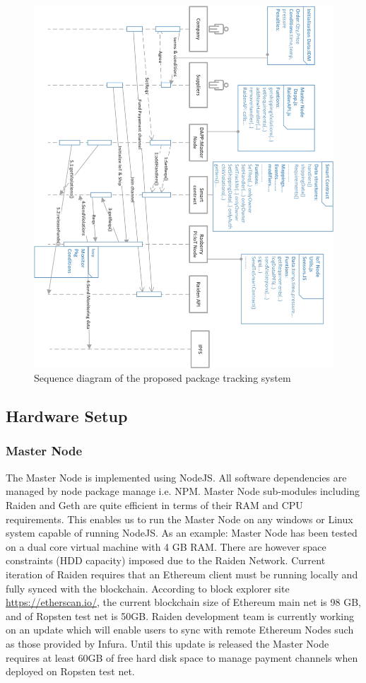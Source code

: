 \begin{figure}[h]
	\centering
    \includegraphics[width=180mm,scale=1]{figs/SD-Flip}
	\caption{Sequence diagram of the proposed package tracking system}
	\label{fig:SysSD} 
\end{figure}
\clearpage

\subsection{Hardware Setup}
\subsubsection{Master Node}
The Master Node is implemented using NodeJS. All software dependencies are managed by node package manage i.e. NPM. Master Node sub-modules including Raiden and Geth are quite efficient in terms of their RAM and CPU requirements. This enables us to run the Master Node on any windows or Linux system capable of running NodeJS. As an example: Master Node has been tested on a dual core virtual machine with 4 GB RAM. There are however space constraints (HDD capacity) imposed due to the Raiden Network. Current iteration of Raiden requires that an Ethereum client must be running locally and fully synced with the blockchain. According to block explorer site \url{https://etherscan.io/}, the current blockchain size of Ethereum main net is 98 GB, and of Ropsten test net is 50GB. Raiden development team is currently working on an update which will enable users to sync with remote Ethereum Nodes such as those provided by Infura. Until this update is released the Master Node requires at least 60GB of free hard disk space to manage payment channels when deployed on Ropsten test net. 
\vspace{0.5cm}
